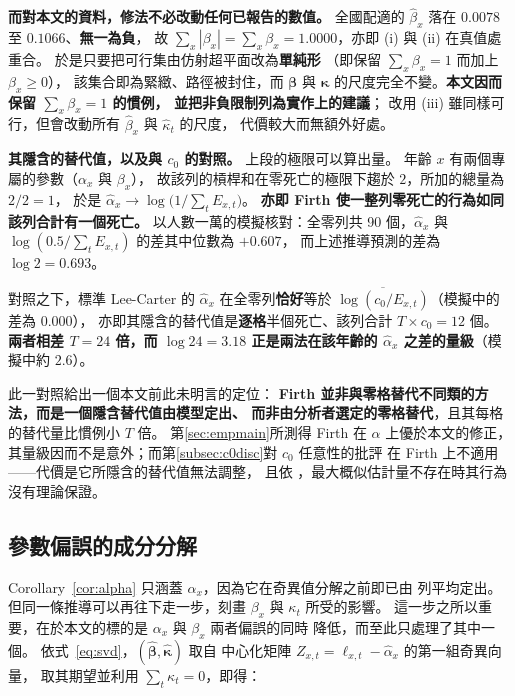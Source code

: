 \documentclass[UTF8, fontset=macnew, a4paper, 12pt]{ctexart}
\begin{document}
\textbf{而對本文的資料，修法不必改動任何已報告的數值。}
全國配適的 $\hat\beta_x$ 落在 $0.0078$ 至 $0.1066$、\textbf{無一為負}，
故 $\sum_x|\beta_x|=\sum_x\beta_x=1.0000$，亦即 (i) 與 (ii) 在真值處重合。
於是只要把可行集由仿射超平面改為\textbf{單純形}
（即保留 $\sum_x\beta_x=1$ 而加上 $\beta_x\ge0$），
該集合即為緊緻、路徑被封住，而 $\boldsymbol\beta$ 與 $\boldsymbol\kappa$
的尺度完全不變。\textbf{本文因而保留 $\sum_x\beta_x=1$ 的慣例，
並把非負限制列為實作上的建議}；
改用 (iii) 雖同樣可行，但會改動所有 $\hat\beta_x$ 與 $\hat\kappa_t$ 的尺度，
代價較大而無額外好處。

\textbf{其隱含的替代值，以及與 $c_0$ 的對照。} 上段的極限可以算出量。
年齡 $x$ 有兩個專屬的參數（$\alpha_x$ 與 $\beta_x$），
故該列的槓桿和在零死亡的極限下趨於 $2$，所加的總量為 $2/2=1$，
於是 $\hat\alpha_x\to\log\big(1/\sum_t E_{x,t}\big)$。
\textbf{亦即 Firth 使一整列零死亡的行為如同該列合計有一個死亡。}
以人數一萬的模擬核對：全零列共 90 個，$\hat\alpha_x$ 與
$\log(0.5/\sum_t E_{x,t})$ 的差其中位數為 $+0.607$，
而上述推導預測的差為 $\log 2=0.693$。

對照之下，標準 Lee-Carter 的 $\hat\alpha_x$ 在全零列\textbf{恰好}等於
$\overline{\log(c_0/E_{x,t})}$（模擬中的差為 $0.000$），
亦即其隱含的替代值是\textbf{逐格}半個死亡、該列合計 $T\times c_0=12$ 個。
\textbf{兩者相差 $T=24$ 倍，而 $\log 24=3.18$ 正是兩法在該年齡的
$\hat\alpha_x$ 之差的量級}（模擬中約 $2.6$）。

此一對照給出一個本文前此未明言的定位：
\textbf{Firth 並非與零格替代不同類的方法，而是一個隱含替代值由模型定出、
而非由分析者選定的零格替代}，且其每格的替代量比慣例小 $T$ 倍。
第\ref{sec:empmain}所測得 Firth 在 $\alpha$ 上優於本文的修正，
其量級因而不是意外；而第\ref{subsec:c0disc}對 $c_0$ 任意性的批評
在 Firth 上不適用——代價是它所隱含的替代值無法調整，
且依 \citet{lewis2024}，最大概似估計量不存在時其行為沒有理論保證。

\subsection{參數偏誤的成分分解}\label{sec:betadec}

Corollary~\ref{cor:alpha} 只涵蓋 $\alpha_x$，因為它在奇異值分解之前即已由
列平均定出。但同一條推導可以再往下走一步，刻畫 $\beta_x$ 與 $\kappa_t$ 所受的影響。
這一步之所以重要，在於本文的標的是 $\alpha_x$ 與 $\beta_x$ 兩者偏誤的同時
降低，而至此只處理了其中一個。
依式~\eqref{eq:svd}，$(\hat{\boldsymbol\beta},\hat{\boldsymbol\kappa})$ 取自
中心化矩陣 $Z_{x,t}=\ell_{x,t}-\hat\alpha_x$ 的第一組奇異向量，
取其期望並利用 $\sum_t\kappa_t=0$，即得：
\end{document}
